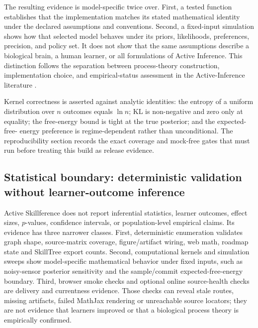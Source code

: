 \documentclass[
  english,
]{article}
\begin{document}
The resulting evidence is model-specific twice over. First, a tested
function establishes that the implementation matches its stated
mathematical identity under the declared assumptions and conventions.
Second, a fixed-input simulation shows how that selected model behaves
under its priors, likelihoods, preferences, precision, and policy set.
It does not show that the same assumptions describe a biological brain,
a human learner, or all formulations of Active Inference. This
distinction follows the separation between process-theory construction,
implementation choice, and empirical-status assessment in the
Active-Inference literature
\citep{friston2017process, dacosta2020synthesis, aguilera2022particular, hodson2024empirical}.

Kernel correctness is asserted against analytic identities: the entropy
of a uniform distribution over \(n\) outcomes equals \(\ln n\); KL is
non-negative and zero only at equality; the free-energy bound is tight
at the true posterior; and the expected-free- energy preference is
regime-dependent rather than unconditional. The reproducibility section
records the exact coverage and mock-free gates that must run before
treating this build as release evidence.

\subsection{Statistical boundary: deterministic validation without
learner-outcome
inference}\label{statistical-boundary-deterministic-validation-without-learner-outcome-inference}

Active Skillference does not report inferential statistics, learner
outcomes, effect sizes, \(p\)-values, confidence intervals, or
population-level empirical claims. Its evidence has three narrower
classes. First, deterministic enumeration validates graph shape,
source-matrix coverage, figure/artifact wiring, web math, roadmap state
and SkillTree export counts. Second, computational kernels and
simulation sweeps show model-specific mathematical behavior under fixed
inputs, such as noisy-sensor posterior sensitivity and the sample/commit
expected-free-energy boundary. Third, browser smoke checks and optional
online source-health checks are delivery and currentness evidence. Those
checks can reveal stale routes, missing artifacts, failed MathJax
rendering or unreachable source locators; they are not evidence that
learners improved or that a biological process theory is empirically
confirmed.
\end{document}
